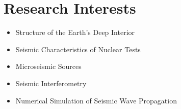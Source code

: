 \section*{Research Interests}

\begin{itemize}
\item Structure of the Earth's Deep Interior
\item Seismic Characteristics of Nuclear Tests
\item Microseismic Sources
\item Seismic Interferometry
\item Numerical Simulation of Seismic Wave Propagation
\end{itemize}
